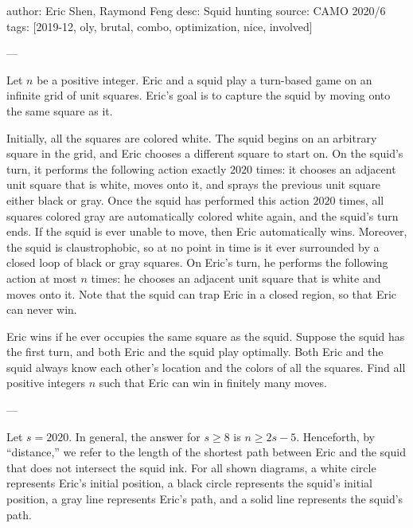 author: Eric Shen, Raymond Feng
desc: Squid hunting
source: CAMO 2020/6
tags: [2019-12, oly, brutal, combo, optimization, nice, involved]

---

Let $n$ be a positive integer. Eric and a squid play a turn-based game on an infinite grid of unit squares. Eric's goal is to capture the squid by moving onto the same square as it.

Initially, all the squares are colored white. The squid begins on an arbitrary square in the grid, and Eric chooses a different square to start on. On the squid's turn, it performs the following action exactly $2020$ times: it chooses an adjacent unit square that is white, moves onto it, and sprays the previous unit square either black or gray. Once the squid has performed this action $2020$ times, all squares colored gray are automatically colored white again, and the squid's turn ends. If the squid is ever unable to move, then Eric automatically wins. Moreover, the squid is claustrophobic, so at no point in time is it ever surrounded by a closed loop of black or gray squares. On Eric's turn, he performs the following action at most $n$ times: he chooses an adjacent unit square that is white and moves onto it. Note that the squid can trap Eric in a closed region, so that Eric can never win.

Eric wins if he ever occupies the same square as the squid. Suppose the squid has the first turn, and both Eric and the squid play optimally. Both Eric and the squid always know each other's location and the colors of all the squares. Find all positive integers $n$ such that Eric can win in finitely many moves.

---

Let $s=2020$. In general, the answer for $s\ge8$ is $n\ge2s-5$. Henceforth, by ``distance,'' we refer to the length of the shortest path between Eric and the squid that does not intersect the squid ink. For all shown diagrams, a white circle represents Eric's initial position, a black circle represents the squid's initial position, a gray line represents Eric's path, and a solid line represents the squid's path.

\bigskip

